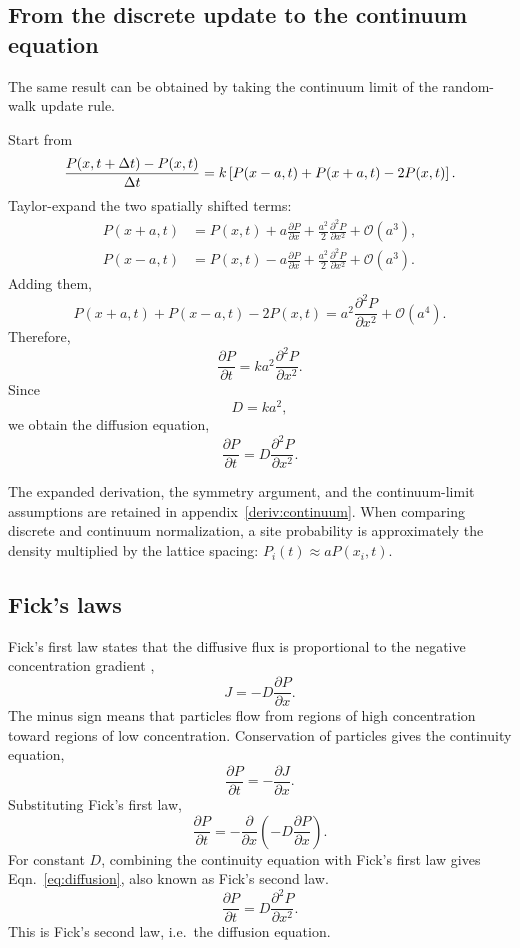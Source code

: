 \subsection{From the discrete update to the continuum equation}
\label{sec:continuum}



The same result can be obtained by taking the continuum limit of the random-walk update rule.

Start from
% 
\[
    \frac{P(x,t+\Delta t)-P(x,t)}{\Delta t} = k \left[ P(x-a,t) + P(x+a,t) - 2P(x,t) \right].
\]
% 
Taylor-expand the two spatially shifted terms:
% 
\begin{align*}
    P(x+a,t) &= P(x,t) + a\frac{\partial P}{\partial x} + \frac{a^2}{2} \frac{\partial^2P}{\partial x^2} + \mathcal{O}(a^3),
    \\
    P(x-a,t) &= P(x,t) - a\frac{\partial P}{\partial x} + \frac{a^2}{2} \frac{\partial^2P}{\partial x^2} + \mathcal{O}(a^3).
\end{align*}
% 
Adding them,
% 
\[
    P(x+a,t) + P(x-a,t) - 2P(x,t) = a^2 \frac{\partial^2P}{\partial x^2} + \mathcal{O}(a^4).
\]
% 
Therefore,
% 
\[
    \frac{\partial P}{\partial t} = ka^2 \frac{\partial^2P}{\partial x^2}.
\]
% 
Since
% 
\[
    D = ka^2,
\]
% 
we obtain the diffusion equation,
% 
\begin{equation}
    \boxed{ \frac{\partial P}{\partial t} = D\frac{\partial^2P}{\partial x^2}. }
    \label{eq:diffusion}
\end{equation}



The expanded derivation, the symmetry argument, and the continuum-limit assumptions are retained in appendix~\ref{deriv:continuum}.
When comparing discrete and continuum normalization, a site probability is approximately the density multiplied by the lattice spacing: $P_i(t)\approx aP(x_i,t)$.
\subsection{Fick's laws}
\label{sec:fick}



Fick's first law states that the diffusive flux is proportional to the negative concentration gradient \cite{fick1855ueber},
\[
    \boxed{J=-D\frac{\partial P}{\partial x}.}
\]
% 
The minus sign means that particles flow from regions of high
concentration toward regions of low concentration.
% 
Conservation of particles gives the continuity equation,
% 
\[
    \frac{\partial P}{\partial t} = -\frac{\partial J}{\partial x}.
\]
% 
Substituting Fick's first law,
% 
\[
    \frac{\partial P}{\partial t} = -\frac{\partial}{\partial x} \left( -D\frac{\partial P}{\partial x} \right).
\]
% 
For constant $D$, combining the continuity equation with Fick's first law gives Eqn.~\eqref{eq:diffusion}, also known as Fick's second law.
% 
\[
    \boxed{ \frac{\partial P}{\partial t} = D\frac{\partial^2P}{\partial x^2}. }
\]
% 
This is Fick's second law, i.e.\ the diffusion equation.


